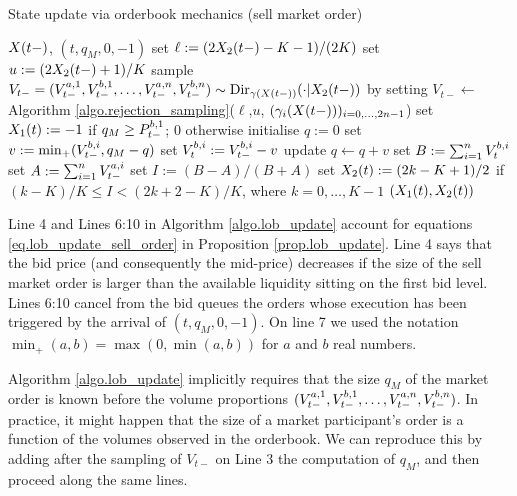 \documentclass[10pt, article,table]{article}
\begin{document}
\begin{algorithm}[h]
 \caption{State update via orderbook mechanics (sell market order)}
 \label{algo.lob_update}
 \begin{algorithmic}[5]
  \REQUIRE $\stateVariable(t-)$, $(t,q_M, 0, -1)$
  \STATE set $\ell := (2\stateVariable_2(t-) - K - 1)/(2K)$
  \STATE set $u:= (2\stateVariable_2(t-) +1)/K$
  \STATE sample $V_{t-} = (\nthBestAskVolume[1]_{t-},\nthBestBidVolume[1]_{t-},\dots,\nthBestAskVolume[n]_{t-},\nthBestBidVolume[n]_{t-}) \sim \text{Dir}_{\dirichletParam(\stateVariable(t-))}(\cdot \vert \stateVariable_2 (t-) )$ by setting $V_{t-} \leftarrow $ Algorithm \ref{algo.rejection_sampling}($\ell$,$u$, $(\dirparam_i(\stateVariable(t-)))_{i=0,\dots,2n-1}$)
  \STATE set $\stateVariable_1(t) := -1$ if $q_M \geq \nthBestBidPrice[1]_{t-}$; $0$ otherwise
  \STATE initialise $q:=0$
  \STATE set $v:= \min_{+} (\nthBestBidVolume[i]_{t-}, q_M - q )$
  \STATE set $\nthBestBidVolume[i]_{t} := \nthBestBidVolume[i]_{t-} - v$
  \STATE update $q\leftarrow q+v$
  \ENDFOR
  \STATE set $B:= \sum_{i=1}^{n} \nthBestBidVolume[i]_t$
  \STATE set $A:= \sum_{i=1}^{n} \nthBestAskVolume[i]_{t-}$
  \STATE set $I:= (B-A)/(B+A)$ 
  \STATE set $\stateVariable_2(t):= (2k-K+1)/2$ if $(k-K)/K \leq I < (2k+2 -K)/K$, where $k=0,\dots,K-1$
  \RETURN $(\stateVariable_1(t),\stateVariable_2(t))$
 \end{algorithmic}
\end{algorithm}

Line 4 and Lines 6:10 in Algorithm \ref{algo.lob_update} account for equations \eqref{eq.lob_update_sell_order} in Proposition \ref{prop.lob_update}. Line 4 says that the bid price (and consequently the mid-price) decreases if the size of the sell market order is larger than the available liquidity sitting on the first bid level. Lines 6:10 cancel from the bid queues the orders whose execution has been triggered by the arrival of $(t,q_M,0,-1)$.  On line 7 we used the notation $\min_{+}(a,b) = \max(0,\min(a,b))$ for $a$ and $b$ real numbers. 

\begin{remark}\label{remark.order_size_after_volume_sampling}
 Algorithm \ref{algo.lob_update} implicitly requires that the size $q_M$ of the market order is known before the volume proportions $(\nthBestAskVolume[1]_{t-},\nthBestBidVolume[1]_{t-},\dots,\nthBestAskVolume[n]_{t-},\nthBestBidVolume[n]_{t-})$. In practice, it might happen that the size of a market participant's order is a function of the volumes observed in the orderbook. We can reproduce this by adding after the sampling of $V_{t-}$ on Line 3 the computation of $q_M$, and then proceed along the same lines.
\end{remark}
\end{document}
